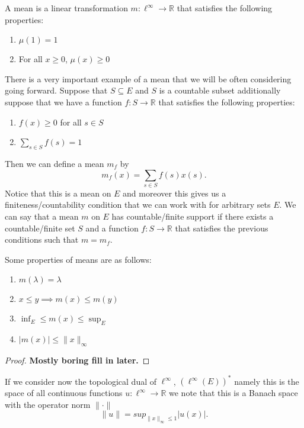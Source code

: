 \begin{defn}
  A mean is a linear transformation $m: \ell^{\infty} \to \mathbb{R}$ that
  satisfies the following properties:
  \begin{enumerate}
    \item $\mu(1) = 1$
    \item For all $x \ge 0$, $\mu(x) \ge 0$
  \end{enumerate}
\end{defn}

\begin{ex}
  There is a very important example of a mean that we will be often considering
  going forward. Suppose that $S \subseteq E$ and $S$ is a countable subset
  additionally suppose that we have a function $f: S \to \mathbb{R}$ that
  satisfies the following properties:
  \begin{enumerate}
    \item $f(x) \ge 0$ for all $s \in S$
    \item $\sum_{s \in S}f(s) = 1 $
  \end{enumerate}
  Then we can define a mean $m_f$ by
  \[
  m_{f}(x) = \sum_{s \in S} f(s)x(s)
  .\] 
  Notice that this is a mean on $E$ and moreover this gives us
  a finiteness/countability condition that we can work with for arbitrary sets
  $E$. We can say that a mean $m$ on $E$ has countable/finite support if there
  exists a countable/finite set $S$ and a function $f: S \to \mathbb{R}$ that
  satisfies the previous conditions such that $m = m_f$.
\end{ex}

\begin{propn}
  Some properties of means are as follows:
  \begin{enumerate}
    \item $m(\lambda) = \lambda$
    \item $x \le y \implies m(x) \le m(y)$
    \item $\inf_E \le m(x) \le \sup_E$ 
    \item $|m(x)| \le \|x\|_{\infty}$
  \end{enumerate}
\end{propn}
\begin{proof}
\textbf{Mostly boring fill in later.}
\end{proof}

If we consider now the topological dual of $\ell^{\infty}$,
$(\ell^{\infty}(E))^{*}$ namely this is the space of all continuous functions $u:
\ell^{\infty} \to \mathbb{R}$ we note that this is a Banach space with the
operator norm $\|\cdot\|$
\[
\|u\| = sup_{\|x\|_{\infty} \le 1}|u(x)| 
.\] 

